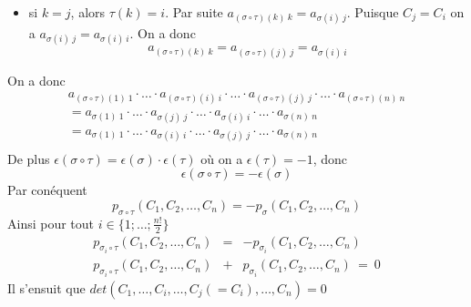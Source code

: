 \begin{enumerate}
\begin{itemize}
      \item si $k = j$, alors $\tau(k) = i$. Par suite $a_{(\sigma \circ \tau)(k) ~ k} = a_{\sigma(i) ~ j}$. Puisque $C_j = C_i$ on a $a_{\sigma(i) ~ j} = a_{\sigma(i) ~ i}$. On a donc
        $$a_{(\sigma \circ \tau)(k) ~ k} = a_{(\sigma \circ \tau)(j) ~ j} = a_{\sigma(i) ~ i}$$
    \end{itemize}
    On a donc
    \begin{eqnarray*}
      a_{(\sigma \circ \tau)(1) ~ 1} \cdot \ldots \cdot a_{(\sigma \circ \tau)(i) ~ i} \cdot \ldots \cdot a_{(\sigma \circ \tau)(j) ~ j} \cdot \ldots \cdot a_{(\sigma \circ \tau)(n) ~ n} \\
        = a_{\sigma(1) ~ 1} \cdot \ldots \cdot a_{\sigma(j) ~ j} \cdot \ldots \cdot a_{\sigma(i) ~ i} \cdot \ldots \cdot a_{\sigma(n) ~ n} \\
        = a_{\sigma(1) ~ 1} \cdot \ldots \cdot a_{\sigma(i) ~ i} \cdot \ldots \cdot a_{\sigma(j) ~ j} \cdot \ldots \cdot a_{\sigma(n) ~ n} \\
    \end{eqnarray*}
    De plus $\epsilon(\sigma \circ \tau) = \epsilon(\sigma) \cdot \epsilon(\tau)$ où on a $\epsilon(\tau) = -1$, donc
    $$\epsilon(\sigma \circ \tau) = -\epsilon(\sigma)$$
    Par conéquent 
    $$p_{\sigma \circ \tau}(C_1, C_2, \ldots, C_n) = -p_{\sigma}(C_1, C_2, \ldots, C_n)$$
    Ainsi pour tout $i\in \{1; \ldots; \frac{n!}{2}\}$
    \begin{eqnarray*}
      p_{\sigma_i \circ \tau}(C_1, C_2, \ldots, C_n) & = & -p_{\sigma_i}(C_1, C_2, \ldots, C_n) \\
      p_{\sigma_i \circ \tau}(C_1, C_2, \ldots, C_n) & + & p_{\sigma_i}(C_1, C_2, \ldots, C_n) ~ = ~ 0
    \end{eqnarray*}
    Il s'ensuit que $det(C_1, \ldots, C_i, \ldots, C_j(=C_i), \ldots, C_n) = 0$
\end{enumerate}

